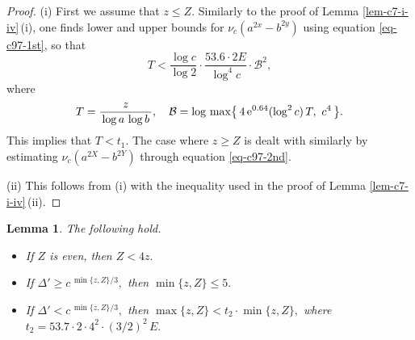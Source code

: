 \documentclass[11pt]{amsart}
\newtheorem{lem}{Lemma}[section]
\numberwithin{equation}{section}
\begin{document}
\begin{proof}
(i) First we assume that $z \le Z$.
Similarly to the proof of Lemma \ref{lem-c7-i-iv}\,(i), one finds lower and upper bounds for $\nu_c(a^{2x}-b^{2y})$ using equation \eqref{eq-c97-1st}, so that
\[
T < \frac{\log c}{\log 2} \cdot \frac{53.6\cdot 2E}{\log^4 c} \cdot \mathcal{B}^2,
\]
where 
\begin{align*}
T=\frac{z}{\,\log a\,\log b\,}, \quad \mathcal{B}=\log\,\max \bigr\{\,4\,{\rm e}^{0.64}(\log^2 c)\,T, \ c^4 \,\bigr\}.
\end{align*}
This implies that $T<t_1$.
The case where $z \ge Z$ is dealt with similarly by estimating $\nu_c(a^{2X}-b^{2Y})$ through equation \eqref{eq-c97-2nd}.
\par
(ii) This follows from (i) with the inequality used in the proof of Lemma \ref{lem-c7-i-iv}\,(ii).
\end{proof}

\begin{lem}\label{max<<min}
The following hold.
\begin{itemize}
\item[\rm (i)]
If $Z$ is even, then $Z<4z.$
\item[\rm (ii)]
If $\Delta' \ge c^{\,\min\{z,Z\}/3},$ then $\min\{z,Z\} \le 5.$
\item[\rm (iii)]
If $\Delta'<c^{\,\min\{z,Z\}/3},$ then $\max\{z,Z\} < t_2 \cdot \min\{z,Z\},$ where $t_2=53.7 \cdot 2 \cdot 4^2 \cdot (3/2)^2\,E.$
\end{itemize}
\end{lem}
\end{document}
